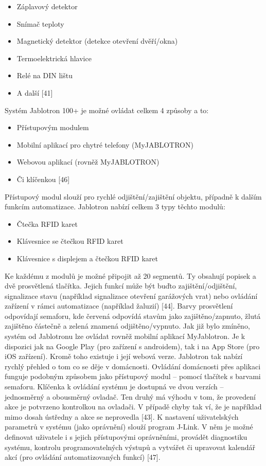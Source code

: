 \begin{itemize}
    \item Záplavový detektor
    \item Snímač teploty
    \item Magnetický detektor (detekce otevření dvěří/okna)
    \item Termoelektrická hlavice
    \item Relé na DIN lištu 
    \item A další [41]
\end{itemize}

Systém Jablotron 100+ je možné ovládat celkem 4 způsoby a to:
\begin{itemize}
    \item Přístupovým modulem
    \item Mobilní aplikací pro chytré telefony (MyJABLOTRON)
    \item Webovou aplikací (rovněž MyJABLOTRON)
    \item Či klíčenkou [46]
\end{itemize}

Přístupový modul slouží pro rychlé odjištění/zajištění objektu, případně k dalším funkcím automatizace. Jablotron nabízí celkem 3 typy těchto modulů:

\begin{itemize}
    \item Čtečka RFID karet
    \item Klávesnice se čtečkou RFID karet
    \item Klávesnice s displejem a čtečkou RFID karet
\end{itemize}

Ke každému z modulů je možné připojit až 20 segmentů. Ty obsahují popisek a dvě prosvětlená tlačítka. Jejich funkcí může být buďto zajištění/odjištění, signalizace stavu (například signalizace otevření garážových vrat) nebo ovládání zařízení v rámci automatizace (například žaluzií) [44]. Barvy prosvětlení odpovídají semaforu, kde červená odpovídá stavům jako zajištěno/zapnuto, žlutá zajištěno částečně a zelená znamená odjištěno/vypnuto. \newline
Jak již bylo zmíněno, systém od Jablotronu lze ovládat rovněž mobilní aplikací MyJablotron. Je k dispozici jak na Google Play (pro zařízení s androidem), tak i na App Store (pro iOS zařízení). Kromě toho existuje i její webová verze. Jablotron tak nabízí rychlý přehled o tom co se děje v domácnosti. Ovládání domácnosti přes aplikaci funguje podobným způsobem jako přístupový modul – pomocí tlačítek s barvami semaforu. \newline
Klíčenka k ovládání systému je dostupná ve dvou verzích – jednosměrný a obousměrný ovladač. Ten druhý má výhodu v tom, že provedení akce je potvrzeno kontrolkou na ovladači. V případě chyby tak ví, že je například mimo dosah ústředny a akce se neprovedla [43]. \newline
K nastavení uživatelských parametrů v systému (jako oprávnění) slouží program J-Link. V něm je možné definovat uživatele i s jejich přístupovými oprávněními, provádět diagnostiku systému, kontrolu programovatelných výstupů a vytvářet či upravovat kalendář akcí (pro ovládání automatizovaných funkcí) [47]. \newline

